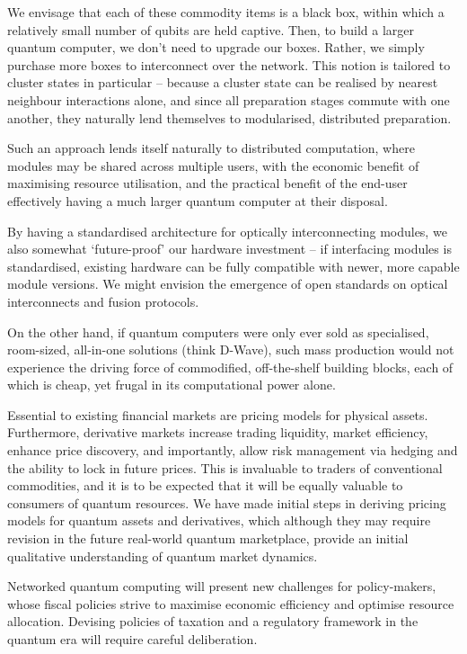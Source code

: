 \documentclass[aps, rmp, twocolumn, amsmath, amssymb, nofootinbib, superscriptaddress, longbibliography, floatfix, table-of-contents, eqsecnum]{revtex4-1}
\newcommand{\comment}[1]{{\color{blue}{\textbf{#1}}}}
\begin{document}
We envisage that each of these commodity items is a black box, within which a relatively small number of qubits are held captive. Then, to build a larger quantum computer, we don't need to upgrade our boxes. Rather, we simply purchase more boxes to interconnect over the network. This notion is tailored to cluster states in particular -- because a cluster state can be realised by nearest neighbour interactions alone, and since all preparation stages commute with one another, they naturally lend themselves to modularised, distributed preparation.

Such an approach lends itself naturally to distributed computation, where modules may be shared across multiple users, with the economic benefit of maximising resource utilisation, and the practical benefit of the end-user effectively having a much larger quantum computer at their disposal.

By having a standardised architecture for optically interconnecting modules, we also somewhat `future-proof' our hardware investment -- if interfacing modules is standardised, existing hardware can be fully compatible with newer, more capable module versions. We might envision the emergence of open standards on optical interconnects and fusion protocols.

On the other hand, if quantum computers were only ever sold as specialised, room-sized, all-in-one solutions (think D-Wave\texttrademark), such mass production would not experience the driving force of commodified, off-the-shelf building blocks, each of which is cheap, yet frugal in its computational power alone.

Essential to existing financial markets are pricing models for physical assets. Furthermore, derivative markets increase trading liquidity, market efficiency, enhance price discovery, and importantly, allow risk management via hedging and the ability to lock in future prices. This is invaluable to traders of conventional commodities, and it is to be expected that it will be equally valuable to consumers of quantum resources. We have made initial steps in deriving pricing models for quantum assets and derivatives, which although they may require revision in the future real-world quantum marketplace, provide an initial qualitative understanding of quantum market dynamics. \comment{Advantages of derivatives}

Networked quantum computing will present new challenges for policy-makers, whose fiscal policies strive to maximise economic efficiency and optimise resource allocation. Devising policies of taxation and a regulatory framework in the quantum era will require careful deliberation.
\end{document}
